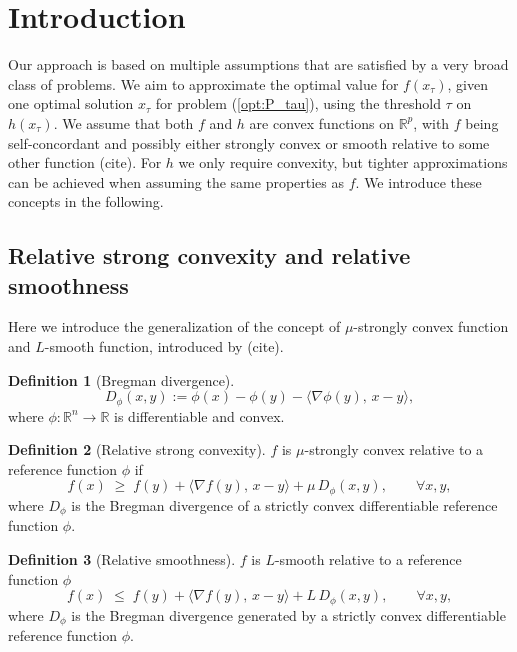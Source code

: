 \documentclass[11pt]{article}
\theoremstyle{definition}
\newtheorem{definition}{Definition}[section]
\theoremstyle{remark}
\theoremstyle{plain}
\theoremstyle{definition}
\newcommand{\R}{\mathbb{R}}
\newcommand{\1}{\mathbf{1}}
\newcommand{\citeReq}{{\color{red} (cite)}}
\renewcommand{\R}{\mathbb{R}}
\begin{document}
\section{Introduction}

Our approach is based on multiple assumptions that are satisfied by a very broad class of problems. We aim to approximate the optimal value for $f(x_\tau)$, given one optimal solution $x_\tau$ for problem (\ref{opt:P_tau}), using the threshold $\tau$ on $h(x_\tau)$. We assume that both $f$ and $h$ are convex functions on $\R^p$, with $f$ being self-concordant and possibly either strongly convex or smooth relative to some other function \citeReq. For $h$ we only require convexity, but tighter approximations can be achieved when assuming the same properties as $f$. We introduce these concepts in the following.

\subsection{Relative strong convexity and relative smoothness}

Here we introduce the generalization of the concept of $\mu$-strongly convex function and $L$-smooth function, introduced by \citeReq. 

\begin{definition}[Bregman divergence]
\[
D_{\phi}(x,y)
:= \phi(x) - \phi(y) - \langle \nabla \phi(y),\, x - y \rangle ,
\]
where \(\phi:\mathbb{R}^n\to\mathbb{R}\) is differentiable and convex.
\end{definition}

\begin{definition}[Relative strong convexity]
$f$ is $\mu$-strongly convex relative to a reference function $\phi$ if 
\[
f(x) \;\ge\;
f(y) + \langle \nabla f(y),\, x - y \rangle
+ \mu\, D_{\phi}(x,y),
\qquad \forall x,y ,
\]
where \(D_{\phi}\) is the Bregman divergence of a strictly convex differentiable reference function \(\phi\).
\end{definition}

\begin{definition}[Relative smoothness]
 $f$ is $L$-smooth relative to a reference function $\phi$
\[
f(x) \;\le\;
f(y) + \langle \nabla f(y),\, x - y \rangle
+ L\, D_{\phi}(x,y),
\qquad \forall x,y ,
\]
where \(D_{\phi}\) is the Bregman divergence generated by a strictly convex differentiable reference function \(\phi\).
\end{definition}
\end{document}
